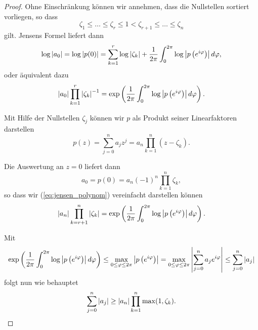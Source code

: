 \begin{proof}
    Ohne Einschränkung können wir annehmen, dass die Nullstellen sortiert
    vorliegen, so dass
    \[
        \zeta_1 \leq \dots \leq \zeta_r \leq 1 < \zeta_{r+1} \leq \dots \leq \zeta_n
    \]
    gilt.
    Jensens Formel liefert dann
    \[
        \log \left\lvert a_0 \right\rvert
        = \log \left\lvert p(0) \right\rvert
        = \sum_{k=1}^{r} \log \left\lvert \zeta_k \right\rvert + \frac{1}{2\pi} \int_{0}^{2\pi} \log \left\lvert p\left( e^{i\varphi} \right) \right\rvert d\varphi,
    \]
    oder äquivalent dazu
    \begin{equation}
        \label{eq:jensen_polynom}
        \left\lvert a_0 \right\rvert \prod_{k=1}^{r} \left\lvert \zeta_k \right\rvert^{-1}
        = \exp\left( \frac{1}{2\pi} \int_{0}^{2\pi} \log \left\lvert p\left( e^{i\varphi} \right) \right\rvert d\varphi \right).
    \end{equation}

    \noindent Mit Hilfe der Nullstellen $\zeta_j$ können wir $p$ als Produkt
    seiner Linearfaktoren darstellen
    \[
        p(z) = \sum_{j = 0}^{n} a_j z^j = a_n \prod_{k=1}^n (z-\zeta_k).
    \]

    \noindent Die Auswertung an $z=0$ liefert dann
    \[
        a_0 = p(0) = a_n (-1)^n \prod_{k=1}^n \zeta_k,
    \]
    so dass wir (\ref{eq:jensen_polynom}) vereinfacht darstellen können
    \[
        \left\lvert a_n \right\rvert \prod_{k=r+1}^{n} \left\lvert \zeta_k \right\rvert
        = \exp\left( \frac{1}{2\pi} \int_{0}^{2\pi} \log \left\lvert p\left( e^{i\varphi} \right) \right\rvert d\varphi \right).
    \]

    \noindent Mit
    \begin{equation}
        \label{eq:jensen_integral_estimation}
        \exp\left( \frac{1}{2\pi} \int_{0}^{2\pi} \log \left\lvert p\left( e^{i\varphi} \right) \right\rvert d\varphi \right)
        \leq \max_{0 \leq \varphi \leq 2\pi} \left\lvert p\left( e^{i\varphi} \right)  \right\rvert
        = \max_{0 \leq \varphi \leq 2\pi} \left\lvert \sum_{j=0}^{n} a_j e^{i\varphi} \right\rvert
        \leq \sum_{j=0}^{n} \left\lvert a_j \right\rvert
    \end{equation}
    folgt nun wie behauptet
    \[
        \sum_{j=0}^n \left\lvert a_j \right\rvert \geq \left\lvert a_n \right\rvert \prod_{k=1}^n \max(1, \zeta_k).
    \]


\end{proof}
